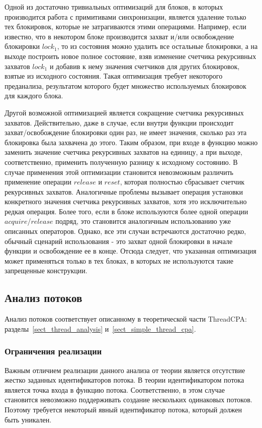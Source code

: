 Одной из достаточно тривиальных оптимизаций для блоков, в которых производится работа с примитивами синхронизации, является удаление только тех блокировок, которые не затрагиваются этими операциями. 
Например, если известно, что в некотором блоке производится захват и/или освобождение блокировки $lock_1$, то из состояния можно удалить все остальные блокировки, а на выходе построить новое полное состояние, взяв изменение счетчика рекурсивных захватов $lock_1$ и добавив к нему значения счетчиков для других блокировок, взятые из исходного состояния. 
Такая оптимизация требует некоторого преданализа, результатом которого будет множество используемых блокировок для каждого блока.

Другой возможной оптимизацией является сокращение счетчика рекурсивных захватов.
Действительно, даже в случае, если внутри функции происходит захват/освобождение блокировки один раз, не имеет значения, сколько раз эта блокировка была захвачена до этого. 
Таким образом, при входе в функцию можно заменить значение счетчика рекурсивных захватов на единицу, а при выходе, соответственно, применить полученную разницу к исходному состоянию.
В случае применения этой оптимизации становится невозможным различить применение операции $release$ и $reset$, которая полностью сбрасывает счетчик рекурсивных захватов. 
Аналогичные проблемы вызывает операция установки конкретного значения счетчика рекурсивных захватов, хотя это исключительно редкая операция.
Более того, если в блоке используются более одной операции $acquire$/$release$ подряд, это становится аналогичным использованию уже описанных операторов.
Однако, все эти случаи встречаются достаточно редко, обычный сценарий использования - это захват одной блокировки в начале функции и освобождение ее в конце.
Отсюда следует, что указанная оптимизация может применяться только в тех блоках, в которых не используются такие запрещенные конструкции.

\subsection{Анализ потоков}
Анализ потоков соответствует описанному в теоретической части ThreadCPA: разделы~\ref{sect_thread_analysis} и~\ref{sect_simple_thread_cpa}.

\subsubsection{Ограничения реализации}

Важным отличием реализации данного анализа от теории является отсутствие жестко заданных идентификаторов потока. 
В теории идентификатором потока является точка входа в функцию потока. 
Соответственно, в этом случае становится невозможно поддерживать создание нескольких одинаковых потоков. 
Поэтому требуется некоторый явный идентификатор потока, который должен быть уникален.

